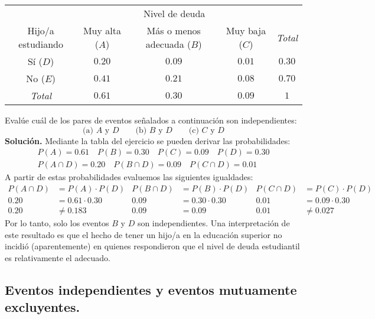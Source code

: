 \documentclass[12pt]{article}
\begin{document}
\begin{table}[hbt!]
\centering
\renewcommand{\arraystretch}{1.3}
\begin{tabular}{c c c c c}
\hline
                  &             \multicolumn{3}{c}{Nivel de deuda}               &            \\
\cline{2-4}
Hijo/a estudiando & Muy alta ($A$) & Más o menos adecuada ($B$) & Muy baja ($C$) & \textit{Total} \\
\hline
Sí ($D$)          &     $0.20$     &       $0.09$               &    $0.01$      &     $0.30$ \\
No ($E$)          &     $0.41$     &       $0.21$               &    $0.08$      &     $0.70$ \\
\textit{Total}    &     $0.61$     &       $0.30$               &    $0.09$      &     $1$ \\
\hline
\end{tabular}

\end{table}

Evalúe cuál de los pares de eventos señalados a continuación son independientes:
\[
\text{(a) } A \text{ y } D \qquad \text{(b) } B \text{ y } D \qquad \text{(c) } C \text{ y } D
\]
\textbf{Solución.} Mediante la tabla del ejercicio se pueden derivar las probabilidades:
\begin{align*}
P(A) = 0.61 \quad P(B) = 0.30 \quad P(C) = 0.09 \quad P(D) = 0.30 \\
P(A \cap D) = 0.20 \quad P(B \cap D) = 0.09 \quad P(C \cap D) = 0.01
\end{align*}
A partir de estas probabilidades evaluemos las siguientes igualdades:
\begin{align*}
  P(A \cap D) &= P(A) \cdot P(D) & P(B \cap D) &= P(B) \cdot P(D) & P(C \cap D) &= P(C) \cdot P(D) \\
         0.20 &= 0.61 \cdot 0.30 &        0.09 &= 0.30 \cdot 0.30 &        0.01 &= 0.09 \cdot 0.30 \\
         0.20 &\neq 0.183        &        0.09 &= 0.09            &        0.01 &\neq 0.027
\end{align*}
Por lo tanto, solo los eventos $B$ y $D$ son independientes. Una interpretación de este resultado es que el hecho de tener un hijo/a en la educación superior no incidió (aparentemente) en quienes respondieron que el nivel de deuda estudiantil es relativamente el adecuado.

\subsection{Eventos independientes y eventos mutuamente excluyentes.}
\end{document}
